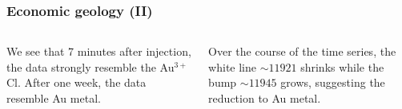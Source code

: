 \documentclass[10pt, xcolor=x11names, compress]{beamer}
\begin{document}
\begin{frame}
  \frametitle{Economic geology (II)}

  \begin{columns}[T]
    \begin{column}{0.5\linewidth}
      We see that \alert{7 minutes} after injection, the data strongly
      resemble the {\color{Blue3}Au$^{3+}$Cl}.  After
      {\color{Purple4}one week}, the data resemble
      {\color{Green4}Au metal}.
    \end{column}
    \begin{column}{0.5\linewidth}
      Over the course of the time series, the white line $\sim11921$
      shrinks while the bump $\sim11945$ grows, suggesting the
      reduction to Au metal.
    \end{column}
  \end{columns}

  \bigskip


\end{frame}
\end{document}
